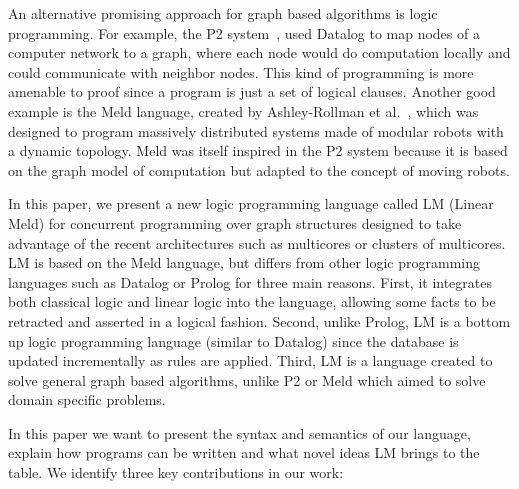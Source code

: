 An alternative promising approach for graph based algorithms 
is logic programming. For example, the P2 system~\cite{Loo-condie-garofalakis-p2}, used Datalog to map nodes of a computer network
to a graph, where each node would do computation locally and could communicate with neighbor nodes.
This kind of programming is more amenable to proof since a program is just a set of logical clauses.
Another good example is the Meld language, created by
Ashley-Rollman et al.~\cite{ashley-rollman-derosa-iros07wksp,ashley-rollman-iclp09}, which was designed to
program massively distributed systems made of modular robots with a dynamic topology. Meld was itself inspired
in the P2 system because it is based on the graph model of computation but adapted to the concept of moving
robots.

In this paper, we present a new logic programming language called LM (Linear Meld) for concurrent programming over graph structures designed to take advantage
of the recent architectures such as multicores or clusters of multicores. LM is based on the Meld language, but differs from other logic programming languages
such as Datalog or Prolog for three main reasons. First, it integrates both classical
logic and linear logic into the language, allowing some facts to be retracted and asserted in a logical fashion. Second, unlike
Prolog, LM is a bottom up logic programming language (similar to Datalog) since the database is updated incrementally as rules are
applied. Third, LM is a language created to solve general graph based algorithms, unlike P2 or Meld which aimed to solve domain
specific problems.

In this paper we want to present the syntax and semantics of our language, explain how programs can be written
and what novel ideas LM brings to the table. We identify three key contributions in our work:

